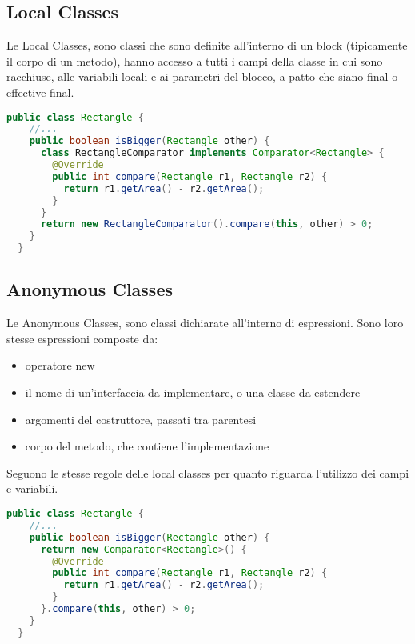 \documentclass[a4paper,12pt,twoside]{book}
\begin{document}
\subsection{Local Classes}

Le Local Classes, sono classi che sono definite all’interno di un
block (tipicamente il corpo di un metodo), hanno accesso a tutti i
campi della classe in cui sono racchiuse, alle variabili locali e ai
parametri del blocco, a patto che siano final o effective final.

\begin{lstlisting}[caption={Local Classes},
  label={lst:Local},language=Java]
  public class Rectangle {
    //...
    public boolean isBigger(Rectangle other) {
      class RectangleComparator implements Comparator<Rectangle> {
        @Override
        public int compare(Rectangle r1, Rectangle r2) {
          return r1.getArea() - r2.getArea();
        }
      }
      return new RectangleComparator().compare(this, other) > 0;
    }
  }
\end{lstlisting}

\subsection{Anonymous Classes}

Le Anonymous Classes, sono classi dichiarate all’interno di
espressioni. Sono loro stesse espressioni composte da: 
\begin{itemize}
\item operatore new
\item il nome di un’interfaccia da implementare, o una classe da estendere
\item argomenti del costruttore, passati tra parentesi
\item corpo del metodo, che contiene l’implementazione 
\end{itemize}
Seguono le stesse regole delle local classes per quanto riguarda
l’utilizzo dei campi e variabili.

\begin{lstlisting}[caption={Anonymous Classes},
  label={lst:Anonymous},language=Java]
  public class Rectangle {
    //...
    public boolean isBigger(Rectangle other) {
      return new Comparator<Rectangle>() {
        @Override
        public int compare(Rectangle r1, Rectangle r2) {
          return r1.getArea() - r2.getArea();
        }
      }.compare(this, other) > 0;
    }
  }
\end{lstlisting}
\end{document}
